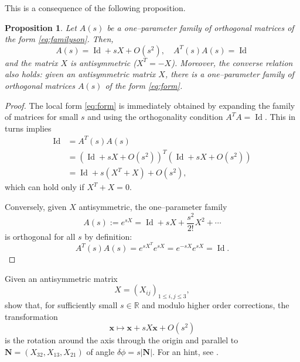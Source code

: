 \documentclass[english,fontsize=11pt,paper=a5,oneside]{scrbook}
\newcommand{\R}{\mathbb{R}}
\newcommand{\bx}{\bm{x}}
\DeclareMathOperator{\Id}{Id}
\newtheorem{proposition}[theorem]{Proposition}
\theoremstyle{definition}
\newenvironment{exercise}
  {\pushQED{\qed}\renewcommand{\qedsymbol}{$\maltese$}\exercisex}
  {\popQED\endexercisex}
\begin{document}
This is a consequence of the following proposition.
\begin{proposition}
  Let $A(s)$ be a one--parameter family of orthogonal matrices of the form \eqref{eq:familyson}.
  Then,
  \begin{equation}\label{eq:form}
    A(s) = \Id + sX + O(s^2), \quad A^T(s)A(s) = \Id
  \end{equation}
  and the matrix $X$ is antisymmetric ($X^T = - X$).
  Moreover, the converse relation also holds: given an antisymmetric matrix $X$, there is a one--parameter family of orthogonal matrices $A(s)$ of the form \eqref{eq:form}.
\end{proposition}
\begin{proof}
  The local form \eqref{eq:form} is immediately obtained by expanding the family of matrices for small $s$ and using the orthogonality condition $A^TA = \Id$.
  This in turns implies
  \begin{align}
    \Id & = A^T(s) A(s)                                                    \\
        & = \left(\Id + sX + O(s^2)\right)^T\left(\Id + sX + O(s^2)\right) \\
        & = \Id + s(X^T + X) + O(s^2),
  \end{align}
  which can hold only if $X^T + X =0$.

  Conversely, given $X$ antisymmetric, the one--parameter family
  \begin{equation}
    A(s) := e^{sX} = \Id + s X + \frac{s^2}{2!} X^2 + \cdots
  \end{equation}
  is orthogonal for all $s$ by definition:
  \begin{equation}
    A^T(s)A(s) = e^{sX^T}e^{sX} = e^{-sX} e^{sX} = \Id.
  \end{equation}
\end{proof}

\begin{exercise}[Euler theorem]\label{exe:rotations}
  Given an antisymmetric matrix
  \begin{equation}
    X = (X_{ij})_{1\leq i,j\leq 3},
  \end{equation}
  show that, for sufficiently small $s\in\R$ and modulo higher order corrections, the transformation
  \begin{equation}
    \bx \mapsto \bx + s X \bx + O(s^2)
  \end{equation}
  is the rotation around the axis through the origin and parallel to $\bm{N}
    = (X_{32}, X_{13}, X_{21})$ of angle $\delta\phi = s|\bm{N}|$.
  For an hint, see \cite[Chpater 26.D]{book:arnold}.
\end{exercise}
\end{document}
